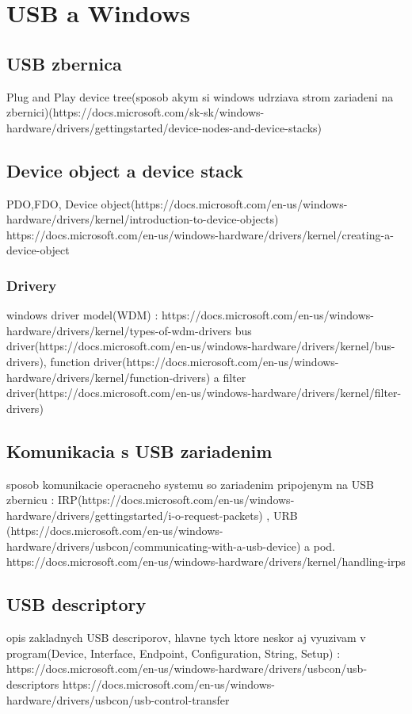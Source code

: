 \chapter{USB a Windows}
\section{USB zbernica}
Plug and Play device tree(sposob akym si windows udrziava strom zariadeni na zbernici)(https://docs.microsoft.com/sk-sk/windows-hardware/drivers/gettingstarted/device-nodes-and-device-stacks)
\section{Device object a device stack}
PDO,FDO, Device object(https://docs.microsoft.com/en-us/windows-hardware/drivers/kernel/introduction-to-device-objects)
https://docs.microsoft.com/en-us/windows-hardware/drivers/kernel/creating-a-device-object
\subsection{Drivery}
windows driver model(WDM) : https://docs.microsoft.com/en-us/windows-hardware/drivers/kernel/types-of-wdm-drivers
bus driver(https://docs.microsoft.com/en-us/windows-hardware/drivers/kernel/bus-drivers), function driver(https://docs.microsoft.com/en-us/windows-hardware/drivers/kernel/function-drivers) a filter driver(https://docs.microsoft.com/en-us/windows-hardware/drivers/kernel/filter-drivers)
\section{Komunikacia s USB zariadenim}
sposob komunikacie operacneho systemu so zariadenim pripojenym na USB zbernicu : IRP(https://docs.microsoft.com/en-us/windows-hardware/drivers/gettingstarted/i-o-request-packets) , URB (https://docs.microsoft.com/en-us/windows-hardware/drivers/usbcon/communicating-with-a-usb-device) a pod.
https://docs.microsoft.com/en-us/windows-hardware/drivers/kernel/handling-irps
\section{USB descriptory}
opis zakladnych USB descriporov, hlavne tych ktore neskor aj vyuzivam v program(Device, Interface, Endpoint, Configuration, String, Setup) : https://docs.microsoft.com/en-us/windows-hardware/drivers/usbcon/usb-descriptors
https://docs.microsoft.com/en-us/windows-hardware/drivers/usbcon/usb-control-transfer
